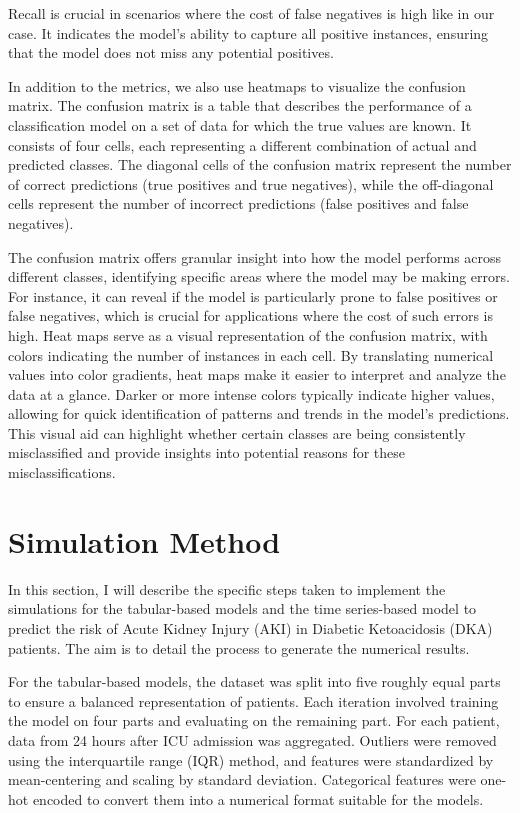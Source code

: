 \documentclass[../main.tex]{subfiles}
\begin{document}
Recall is crucial in scenarios where the cost of false negatives is high like in our case.
It indicates the model's ability to capture all positive instances, ensuring that the model does not miss any potential positives.

In addition to the metrics, we also use heatmaps to visualize the confusion matrix.
The confusion matrix is a table that describes the performance of a classification model on a set of data for which the true values are known.
It consists of four cells, each representing a different combination of actual and predicted classes.
The diagonal cells of the confusion matrix represent the number of correct predictions (true positives and true negatives), while the off-diagonal cells represent the number of incorrect predictions (false positives and false negatives).

The confusion matrix offers granular insight into how the model performs across different classes, identifying specific areas where the model may be making errors.
For instance, it can reveal if the model is particularly prone to false positives or false negatives, which is crucial for applications where the cost of such errors is high.
Heat maps serve as a visual representation of the confusion matrix, with colors indicating the number of instances in each cell.
By translating numerical values into color gradients, heat maps make it easier to interpret and analyze the data at a glance.
Darker or more intense colors typically indicate higher values, allowing for quick identification of patterns and trends in the model's predictions.
This visual aid can highlight whether certain classes are being consistently misclassified and provide insights into potential reasons for these misclassifications.


\section{Simulation Method}

In this section, I will describe the specific steps taken to implement the simulations for the tabular-based models and the time series-based model to predict the risk of Acute Kidney Injury (AKI) in Diabetic Ketoacidosis (DKA) patients.
The aim is to detail the process to generate the numerical results.

For the tabular-based models, the dataset was split into five roughly equal parts to ensure a balanced representation of patients.
Each iteration involved training the model on four parts and evaluating on the remaining part.
For each patient, data from 24 hours after ICU admission was aggregated.
Outliers were removed using the interquartile range (IQR) method, and features were standardized by mean-centering and scaling by standard deviation.
Categorical features were one-hot encoded to convert them into a numerical format suitable for the models.
\end{document}
